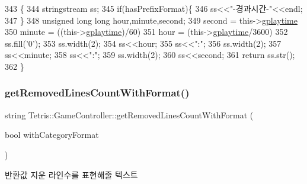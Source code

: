 \begin{DoxyCode}
343                                                           \{
344             stringstream ss;
345             \textcolor{keywordflow}{if}(hasPrefixFormat)\{
346                 ss<<\textcolor{stringliteral}{"-경과시간-"}<<endl;
347             \}
348             \textcolor{keywordtype}{unsigned} \textcolor{keywordtype}{long} \textcolor{keywordtype}{long} hour,minute,second;
349             second = this->\hyperlink{class_tetris_1_1_game_controller_a562adcade20e362160535cd7248a2cce}{gplaytime}%
350             minute = ((this->\hyperlink{class_tetris_1_1_game_controller_a562adcade20e362160535cd7248a2cce}{gplaytime})/60)%
351             hour = (this->\hyperlink{class_tetris_1_1_game_controller_a562adcade20e362160535cd7248a2cce}{gplaytime}/3600)%
352             ss.fill(\textcolor{charliteral}{'0'});
353             ss.width(2);
354             ss<<hour;
355             ss<<\textcolor{stringliteral}{":"};
356             ss.width(2);
357             ss<<minute;
358             ss<<\textcolor{stringliteral}{":"};
359             ss.width(2);
360             ss<<second;
361             \textcolor{keywordflow}{return} ss.str();
362         \}
\end{DoxyCode}
\mbox{\label{class_tetris_1_1_game_controller_acd543d841613ed6c3645659d34e0b723}} 
\subsubsection{\texorpdfstring{get\+Removed\+Lines\+Count\+With\+Format()}{getRemovedLinesCountWithFormat()}}
{\footnotesize\ttfamily string Tetris\+::\+Game\+Controller\+::get\+Removed\+Lines\+Count\+With\+Format (\begin{DoxyParamCaption}\item[{bool}]{with\+Category\+Format }\end{DoxyParamCaption})\hspace{0.3cm}{\ttfamily [inline]}}

\begin{DoxyReturn}{반환값}
지운 라인수를 표현해줄 텍스트 
\end{DoxyReturn}


